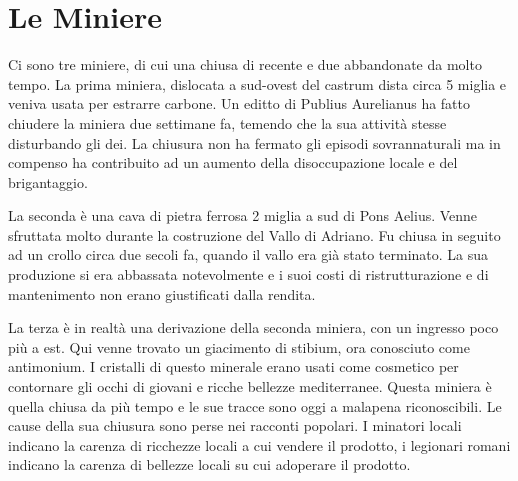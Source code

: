 \documentclass[11.5pt,twocolumn]{article}
\begin{document}


\section{Le Miniere}
%
Ci sono tre miniere, di cui una chiusa di recente e due abbandonate da molto tempo.
La prima miniera, dislocata a sud-ovest del castrum dista circa 5 miglia e veniva usata per estrarre carbone.
Un editto di Publius Aurelianus ha fatto chiudere la miniera due settimane fa, temendo che la sua attivit\`{a} stesse disturbando gli dei.
La chiusura non ha fermato gli episodi sovrannaturali ma in compenso ha contribuito ad un aumento della disoccupazione locale e del brigantaggio.

La seconda \`{e} una cava di pietra ferrosa 2 miglia a sud di Pons Aelius.
Venne sfruttata molto durante la costruzione del Vallo di Adriano.
Fu chiusa in seguito ad un crollo circa due secoli fa, quando il vallo era gi\`{a} stato terminato.
La sua produzione si era abbassata notevolmente e i suoi costi di ristrutturazione e di mantenimento non erano giustificati dalla rendita.

La terza \`{e} in realt\`{a} una derivazione della seconda miniera, con un ingresso poco pi\`{u} a est.
Qui venne trovato un giacimento di stibium, ora conosciuto come antimonium.
I cristalli di questo minerale erano usati come cosmetico per contornare gli occhi di giovani e ricche bellezze mediterranee.
Questa miniera \`{e} quella chiusa da pi\`{u} tempo e le sue tracce sono oggi a malapena riconoscibili.
Le cause della sua chiusura sono perse nei racconti popolari.
I minatori locali indicano la carenza di ricchezze locali a cui vendere il prodotto, i legionari romani indicano la carenza di bellezze locali su cui adoperare il prodotto.
\end{document}
